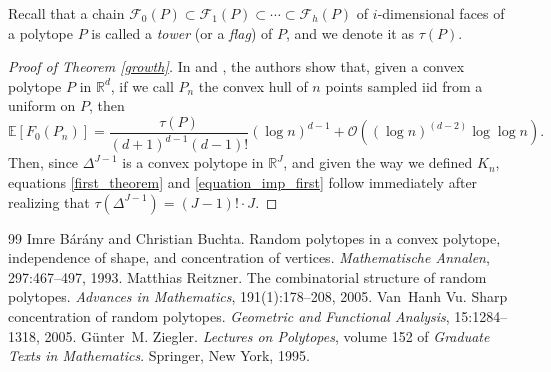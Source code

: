 \documentclass[10pt,a4paper]{amsart}
\theoremstyle{plain}
\begin{document}
Recall that a chain $\mathcal{F}_0(P)\subset \mathcal{F}_1(P) \subset \cdots \subset \mathcal{F}_{h}(P)$ of $i$-dimensional faces of a polytope $P$ is called a \textit{tower} (or a \textit{flag}) of $P$, and we denote it as $\tau(P)$.

\begin{proof}[Proof of Theorem \ref{growth}]
 In \cite[Theorem 6]{reitzner} and \cite[Theorem 5]{barany2}, the authors show that, given a convex polytope $P$ in $\mathbb{R}^d$, if we call $P_n$ the convex hull of $n$ points sampled iid from a uniform on $P$, then 
$$\mathbb{E} \left[F_0(P_n)\right] = \frac{\tau(P)}{(d+1)^{d-1}  (d-1)!}  (\log n)^{d-1} + \mathcal{O} \left( (\log n)^{(d-2)} \log\log n \right).$$
Then, since $\Delta^{J-1}$ is a convex polytope in $\mathbb{R}^J$, and given the way we defined $K_n$, equations \eqref{first_theorem} and \eqref{equation_imp_first} follow immediately after realizing that $\tau(\Delta^{J-1})=(J-1)! \cdot J$.
\end{proof}

\begin{thebibliography}{99}
 Imre B{\'a}r{\'a}ny and Christian Buchta. Random polytopes in a convex polytope, independence of shape, and concentration of vertices. {\em Mathematische Annalen}, 297:467--497, 1993.
 Matthias Reitzner. The combinatorial structure of random polytopes. {\em Advances in Mathematics}, 191(1):178--208, 2005.
 Van~Hanh Vu. Sharp concentration of random polytopes. {\em Geometric and Functional Analysis}, 15:1284--1318, 2005.
 G{\"u}nter~M. Ziegler. {\em Lectures on Polytopes}, volume 152 of {\em Graduate Texts in Mathematics}. Springer, New York, 1995.
\end{thebibliography}
\end{document}
